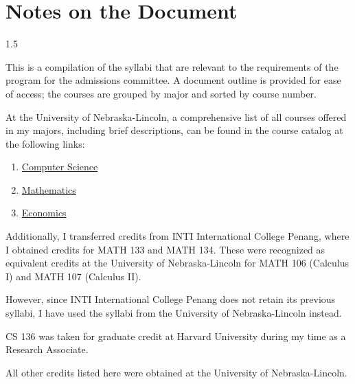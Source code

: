 \documentclass[10pt, a4paper]{article}
\begin{document}
%

{
\selectfont %
\fontsize{10pt}{12pt}\selectfont

}



\newpage

\tableofcontents
\newpage

\section{Notes on the Document}
\label{sec: notes on document}

\begin{spacing}{1.5}

This is a compilation of the syllabi that are relevant to the requirements of the program for the admissions committee. A document outline is provided for ease of access; the courses are grouped by major and sorted by course number.

At the University of Nebraska-Lincoln, a comprehensive list of all courses offered in my majors, including brief descriptions, can be found in the course catalog at the following links:

\begin{enumerate}
    \item \href{https://catalog.unl.edu/undergraduate/engineering/computer-science/#newitemtext}{Computer Science}
    \item \href{https://catalog.unl.edu/undergraduate/courses/math/}{Mathematics}
    \item \href{https://catalog.unl.edu/undergraduate/courses/econ/}{Economics}
\end{enumerate}

Additionally, I transferred credits from INTI International College Penang, where I obtained credits for MATH 133 and MATH 134. These were recognized as equivalent credits at the University of Nebraska-Lincoln for MATH 106 (Calculus I) and MATH 107 (Calculus II). 

However, since INTI International College Penang does not retain its previous syllabi, I have used the syllabi from the University of Nebraska-Lincoln instead.

CS 136 was taken for graduate credit at Harvard University during my time as a Research Associate.

All other credits listed here were obtained at the University of Nebraska-Lincoln.

\end{spacing}
\end{document}

